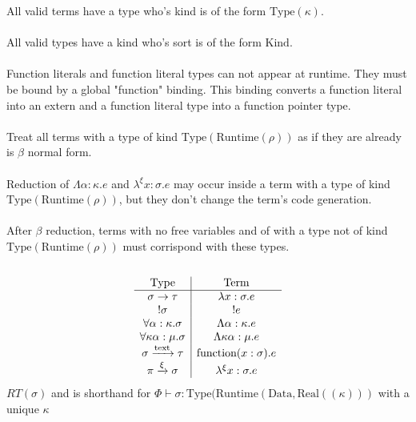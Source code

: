 \documentclass {article}
\begin{document}
All valid terms have a type who's kind is of the form $ \text{Type} (\kappa) $. \\
\\
All valid types have a kind who's sort is of the form $ \text{Kind} $.\\
\\
Function literals and function literal types can not appear at runtime. They must be bound by a global "function" binding.
This binding converts a function literal into an extern and a function literal type into a function pointer type. \\
\\
Treat all terms with a type of kind $ \text{Type} (\text{Runtime} (\rho)) $ as if they are already is $ \beta $ normal form. \\
\\
Reduction of $ \Lambda \alpha : \kappa. e $ and $ \lambda^\xi x : \sigma. e $ may occur inside a term with a type of kind $ \text{Type} (\text{Runtime} (\rho)) $, but they don't
change the term's code generation. \\
\\
After $ \beta $ reduction, terms with no free variables and of with a type not of kind $ \text{Type} (\text{Runtime} (\rho) ) $ must corrispond with these types. \\
\\
\begin{gather*}
\begin{array}{c | c}
\text{Type} & \text{Term} \\
\hline
\sigma \to \tau & \lambda x : \sigma. e \\
!\sigma & !e \\
\forall \alpha : \kappa. \sigma & \Lambda \alpha : \kappa. e  \\
\forall \kappa \alpha : \mu. \sigma & \Lambda \kappa \alpha : \mu. e \\
\sigma \xrightarrow{\text{text}} \tau & \text{function}(x : \sigma). e \\
\pi \xrightarrow{\xi} \sigma & \lambda^\xi x : \sigma. e
\end{array}
\\
\end{gather*}
$ RT (\sigma) $ and is shorthand for $ \Phi \vdash \sigma : \text{Type} (\text{Runtime} (\text{Data}, \text{Real} ((\kappa))) $ with a unique $ \kappa $ \\
\end{document}
